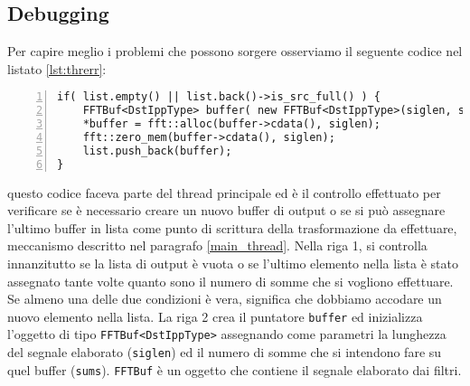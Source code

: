 \subsection{Debugging}
Per capire meglio i problemi che possono sorgere osserviamo il seguente codice
nel listato \ref{lst:threrr}:
\begin{lstlisting}[numbers=left,frame=l,float,caption=Codice problematico nel caso
	di pi\`u threads attivi,label=lst:threrr]
if( list.empty() || list.back()->is_src_full() ) {
	FFTBuf<DstIppType> buffer( new FFTBuf<DstIppType>(siglen, sums) );
	*buffer = fft::alloc(buffer->cdata(), siglen);
	fft::zero_mem(buffer->cdata(), siglen);
	list.push_back(buffer);
}
\end{lstlisting}
questo codice faceva parte del thread principale ed \`e il controllo effettuato
per verificare se \`e necessario creare un nuovo buffer di output o se si pu\`o
assegnare l'ultimo buffer in lista come punto di scrittura della trasformazione
da effettuare, meccanismo descritto nel paragrafo \ref{main_thread}. Nella riga
1, si controlla innanzitutto se la lista di output \`e vuota o se l'ultimo
elemento nella lista \`e stato assegnato tante volte quanto sono il numero di
somme che si vogliono effettuare. Se almeno una delle due condizioni \`e vera,
significa che dobbiamo accodare un nuovo elemento nella lista. La riga 2 crea il
puntatore \texttt{buffer} ed inizializza l'oggetto di tipo
\texttt{FFTBuf<DstIppType>} assegnando come parametri la lunghezza del segnale
elaborato (\texttt{siglen}) ed il numero di somme che si intendono fare su quel
buffer (\texttt{sums}). \texttt{FFTBuf} \`e un oggetto che contiene il segnale
elaborato dai filtri.
